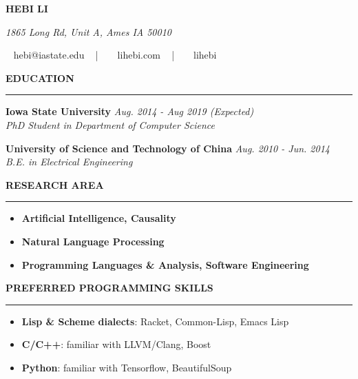 \documentclass[10pt,letterpaper]{article}
\newenvironment{mysection}[1]{ %
  \medskip
  \MakeUppercase{\bf #1}
  \medskip
  \hrule
  \begin{list}{}{
      \setlength{\leftmargin}{1.5em}
    }
  \item[]
}{
  \end{list}
}
\begin{document}
\centerline{\MakeUppercase{\huge\bf Hebi Li}}
\centerline{\textit{\textcolor{mygray}{1865 Long Rd, Unit A, Ames IA
      50010}}} \centerline{\faEnvelope ~ hebi@iastate.edu ~ | ~
  \faHome ~ lihebi.com ~ | ~ \faGithubSquare ~ lihebi}

\begin{mysection}{Education}
  \textbf{Iowa State University} \hfill \emph{Aug. 2014 - Aug 2019 (Expected)} \\
  \emph{PhD Student in Department of Computer Science}

  \textbf{University of Science and Technology of China}
  \hfill \emph{Aug. 2010 - Jun. 2014} \\
  \emph{B.E. in Electrical Engineering}
\end{mysection}

\begin{mysection}{Research Area}
  \begin{itemize}
  \item \textbf{Artificial Intelligence, Causality}
  \item \textbf{Natural Language Processing}
  \item \textbf{Programming Languages \& Analysis, Software Engineering}
  \end{itemize}
\end{mysection}

\begin{mysection}{Preferred Programming Skills}
  \begin{itemize}
  \item \textbf{Lisp \& Scheme dialects}: Racket, Common-Lisp, Emacs
    Lisp
  \item \textbf{C/C++}: familiar with LLVM/Clang, Boost
  \item \textbf{Python}: familiar with Tensorflow, BeautifulSoup
  \end{itemize}
\end{mysection}
\end{document}
